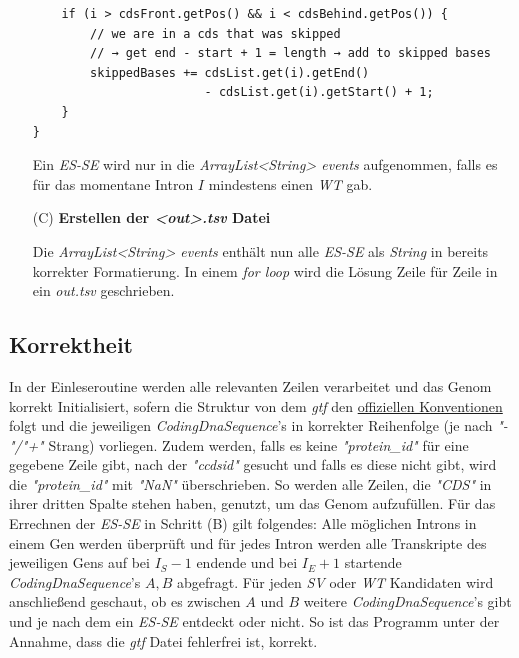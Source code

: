 \documentclass[12pt]{article}
\begin{document}
\begin{enumerate}
\begin{verbatim}
    if (i > cdsFront.getPos() && i < cdsBehind.getPos()) {
        // we are in a cds that was skipped
        // → get end - start + 1 = length → add to skipped bases
        skippedBases += cdsList.get(i).getEnd() 
                        - cdsList.get(i).getStart() + 1;
    }
}
    \end{verbatim}
    Ein \textit{ES-SE} wird nur in die \textit{ArrayList<String> events} aufgenommen, falls es für das momentane
    Intron $I$ mindestens einen \textit{WT} gab.

    \item[(C)] \textbf{Erstellen der \textit{<out>.tsv} Datei}

    Die \textit{ArrayList<String> events} enthält nun alle \textit{ES-SE} als \textit{String} in bereits
    korrekter Formatierung. In einem \textit{for loop} wird die Lösung Zeile für Zeile in ein \textit{out.tsv}
    geschrieben.
\end{enumerate}

\subsection{Korrektheit}
In der Einleseroutine werden alle relevanten Zeilen verarbeitet und das Genom
korrekt Initialisiert, sofern die Struktur von dem \textit{gtf} den \href{https://asia.ensembl.org/info/website/upload/gff.html}{offiziellen Konventionen} folgt und die jeweiligen 
\textit{CodingDnaSequence}'s in korrekter Reihenfolge (je nach \textit{"-"/"+"} Strang) vorliegen.
Zudem werden, falls es keine \textit{"protein\_id"} für eine gegebene Zeile gibt, nach der 
\textit{"ccdsid"} gesucht und falls es diese nicht gibt, wird die \textit{"protein\_id"} 
mit \textit{"NaN"} überschrieben. So werden alle Zeilen, die \textit{"CDS"} in ihrer
dritten Spalte stehen haben, genutzt, um das Genom aufzufüllen. 
Für das Errechnen der \textit{ES-SE} in Schritt (B) gilt folgendes:
Alle möglichen Introns in einem Gen werden überprüft und für jedes Intron
werden alle Transkripte des jeweiligen Gens auf bei $I_{S} - 1$ endende  und 
bei $I_{E} + 1$ startende \textit{CodingDnaSequence}'s $A, B$ abgefragt. Für
jeden \textit{SV} oder \textit{WT} Kandidaten wird anschlie\ss end geschaut,
ob es zwischen $A$ und $B$ weitere \textit{CodingDnaSequence}'s gibt und
je nach dem ein \textit{ES-SE} entdeckt oder nicht.
So ist das Programm unter der Annahme, dass die \textit{gtf} Datei fehlerfrei ist, korrekt.
\end{document}
